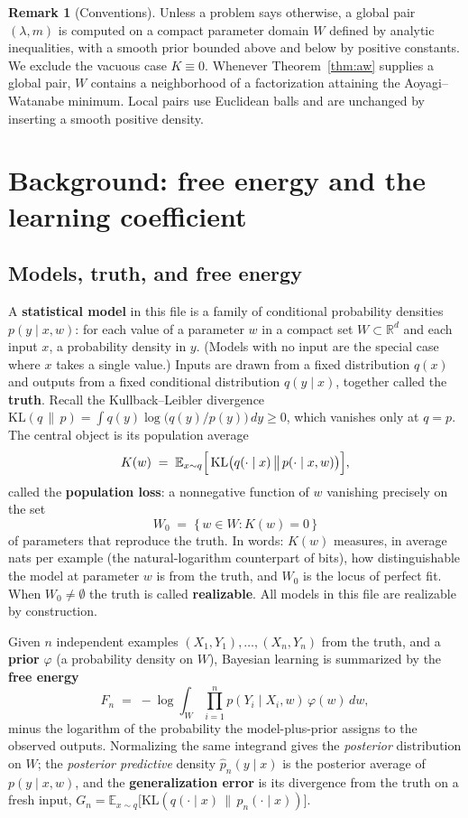 \documentclass[11pt]{amsart}
\theoremstyle{plain}
\theoremstyle{definition}
\newtheorem{remark}[theorem]{Remark}
\newcommand{\KL}{\mathrm{KL}}
\newcommand{\R}{\mathbb{R}}
\newcommand{\E}{\mathbb{E}}
\begin{document}
\begin{remark}[Conventions]\label{rem:conventions}
Unless a problem says otherwise, a global pair $(\lambda,m)$ is computed on a compact parameter domain $W$ defined by analytic inequalities, with a smooth prior bounded above and below by positive constants. We exclude the vacuous case $K\equiv0$. Whenever Theorem~\ref{thm:aw} supplies a global pair, $W$ contains a neighborhood of a factorization attaining the Aoyagi--Watanabe minimum. Local pairs use Euclidean balls and are unchanged by inserting a smooth positive density.
\end{remark}

\section{Background: free energy and the learning coefficient}\label{sec:background}

\subsection{Models, truth, and free energy}\label{subsec:setup}

A \textbf{statistical model} in this file is a family of conditional probability densities $p(y \mid x, w)$: for each value of a parameter $w$ in a compact set $W \subset \R^d$ and each input $x$, a probability density in $y$. (Models with no input are the special case where $x$ takes a single value.) Inputs are drawn from a fixed distribution $q(x)$ and outputs from a fixed conditional distribution $q(y \mid x)$, together called the \textbf{truth}. Recall the Kullback--Leibler divergence $\KL(q\,\|\,p) = \int q(y)\log\bigl(q(y)/p(y)\bigr)\,dy \ge 0$, which vanishes only at $q = p$. The central object is its population average
\[
   K(w) \;=\; \E_{x \sim q}\Bigl[\, \KL\bigl(q(\cdot \mid x)\,\big\|\,p(\cdot \mid x, w)\bigr) \Bigr],
\]
called the \textbf{population loss}: a nonnegative function of $w$ vanishing precisely on the set
\[
   W_0 \;=\; \{\, w \in W : K(w) = 0 \,\}
\]
of parameters that reproduce the truth. In words: $K(w)$ measures, in average nats per example (the natural-logarithm counterpart of bits), how distinguishable the model at parameter $w$ is from the truth, and $W_0$ is the locus of perfect fit. When $W_0 \neq \emptyset$ the truth is called \textbf{realizable}. All models in this file are realizable by construction.

Given $n$ independent examples $(X_1,Y_1),\dots,(X_n,Y_n)$ from the truth, and a \textbf{prior} $\varphi$ (a probability density on $W$), Bayesian learning is summarized by the \textbf{free energy}
\[
   F_n \;=\; -\log \int_W \prod_{i=1}^n p(Y_i \mid X_i, w)\,\varphi(w)\,dw ,
\]
minus the logarithm of the probability the model-plus-prior assigns to the observed outputs. Normalizing the same integrand gives the \emph{posterior} distribution on $W$; the \emph{posterior predictive} density $\hat p_n(y \mid x)$ is the posterior average of $p(y \mid x, w)$, and the \textbf{generalization error} is its divergence from the truth on a fresh input,
$G_n = \E_{x\sim q}\bigl[\KL(q(\cdot \mid x)\,\|\,\hat p_n(\cdot \mid x))\bigr]$.
\end{document}
